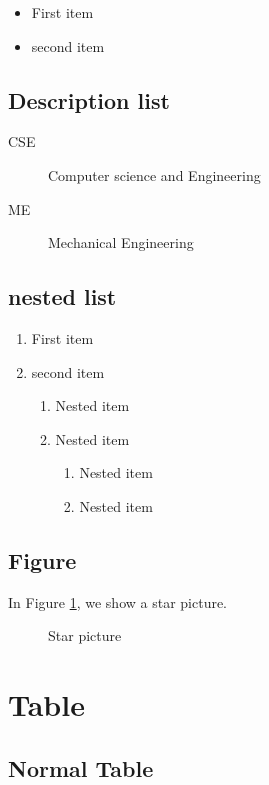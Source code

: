 \documentclass[letter, 12pt]{article}
\begin{document}
\begin{itemize}
	\item First item
	\item second item
\end{itemize}

\subsection{Description list}

\begin{description}
	\item[CSE] Computer science and Engineering
	\item[ME] Mechanical Engineering
\end{description}

\subsection{nested list}
	\begin{enumerate}
		\item First item
		\item second item
		\begin{enumerate}
			\item Nested item
			\item Nested item
			\begin{enumerate}
				\item Nested item
				\item Nested item			
			\end{enumerate}
		\end{enumerate}
	\end{enumerate}
	

\subsection{Figure}

In Figure \ref{pic:star}, we show a star picture. 

\begin{figure}[h]
	\centering
	\caption{Star picture}
	\label{pic:star}
\end{figure}

\section{Table}

\subsection{Normal Table}
\end{document}
